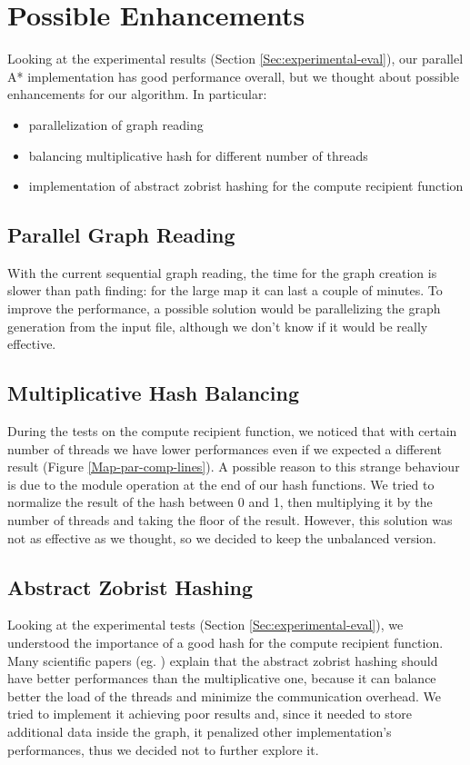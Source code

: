 \section{Possible Enhancements}
\label{Sec:enhancement}

Looking at the experimental results (Section \ref{Sec:experimental-eval}), our parallel A* implementation has good performance overall, 
but we thought about possible enhancements for our algorithm.
In particular:
\begin{itemize}
    \item parallelization of graph reading
    \item balancing multiplicative hash for different number of threads
    \item implementation of abstract zobrist hashing for the compute recipient function
\end{itemize}

\subsection{Parallel Graph Reading}
\label{par_read}

With the current sequential graph reading, the time for the graph creation is slower than path finding: for the large map it can last a couple of minutes.
To improve the performance, a possible solution would be parallelizing the graph generation from the input file,
although we don't know if it would be really effective.

\subsection{Multiplicative Hash Balancing}
\label{balance_mul_hash}

During the tests on the compute recipient function, we noticed that with certain number of threads we have lower performances even if we expected a different result (Figure \ref{Map-par-comp-lines}).
A possible reason to this strange behaviour is due to the module operation at the end of our hash functions.
We tried to normalize the result of the hash between 0 and 1, then multiplying it by the number of threads and taking the floor of the result.
However, this solution was not as effective as we thought, so we decided to keep the unbalanced version. 

\subsection{Abstract Zobrist Hashing}
\label{hash_zobrist}

Looking at the experimental tests (Section \ref{Sec:experimental-eval}), we understood the importance of a good hash for the compute recipient function.
Many scientific papers (eg. \cite{bibParAstar}) explain that the abstract zobrist hashing should have better performances than the multiplicative one,
because it can balance better the load of the threads and minimize the communication overhead.
We tried to implement it achieving poor results and, since it needed to store additional data inside the graph, it penalized 
other implementation's performances, thus we decided not to further explore it.




